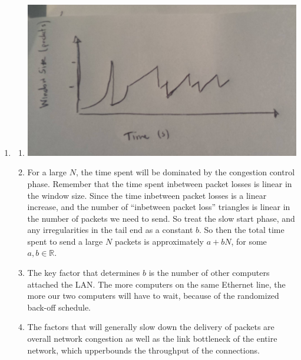 \begin{enumerate}
  \item 
    \begin{enumerate}
      \item 
        \includegraphics[width=1\textwidth]{im2}
      \item
        For a large $N$, the time spent will be dominated by the congestion control phase. Remember that the time spent inbetween packet losses is linear in the window size. Since the time inbetween packet losses is a linear increase, and the number of ``inbetween packet loss'' triangles is linear in the number of packets we need to send. So treat the slow start phase, and any irregularities in the tail end as a constant $b$. So then the total time spent to send a large $N$ packets is approximately $a + bN$, for some $a,b \in \mathds{R}$.
      \item The key factor that determines $b$ is the number of other computers attached the LAN. The more computers on the same Ethernet line, the more our two computers will have to wait, because of the randomized back-off schedule.
      \item The factors that will generally slow down the delivery of packets are overall network congestion as well as the link bottleneck of the entire network, which upperbounds the throughput of the connections.
    \end{enumerate}
    

\end{enumerate}
